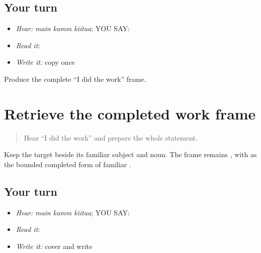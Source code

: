 \subsection*{Your turn}
\begin{itemize}
\raggedright
  \item \emph{Hear:} \emph{main kamm kiitaa}; YOU SAY: \textbf{  }
  \item \emph{Read it:} \textbf{  }
  \item \emph{Write it:} copy \textbf{ } once
\end{itemize}

\begin{tcolorbox}[breakable,colback=teal!4,colframe=teal!35!black,title={Before you move on}]
Produce the complete “I did the work” frame.
\end{tcolorbox}
\section[\texorpdfstring{\pa{ਮੈਂ} \pa{ਕੰਮ} \pa{ਕੀਤਾ} (main kamm kiitaa)}{ਮੈਂ ਕੰਮ ਕੀਤਾ (main kamm kiitaa)}]{Retrieve the completed work frame}

\label{lesson:PA-C190-frame-review}



\begin{quote}
Hear “I did the work” and prepare the whole statement.
\end{quote}

\begin{grammarlens}[title={Grammar Lens}]
Keep the target beside its familiar subject and noun. The frame remains \textbf{  }, with \textbf{} as the bounded completed form of familiar \textbf{}.
\end{grammarlens}

\subsection*{Your turn}
\begin{itemize}
\raggedright
  \item \emph{Hear:} \emph{main kamm kiitaa}; YOU SAY: \textbf{  }
  \item \emph{Read it:} \textbf{  }
  \item \emph{Write it:} cover and write \textbf{  }
\end{itemize}

